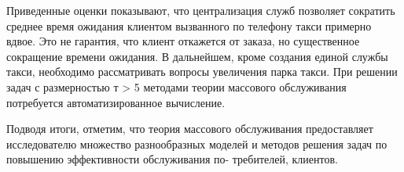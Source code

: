 Приведенные оценки показывают, что централизация служб позволяет сократить среднее время ожидания клиентом вызванного по телефону такси примерно вдвое. Это не гарантия, что клиент откажется от заказа, но существенное сокращение времени ожидания. В дальнейшем, кроме создания единой службы такси, необходимо рассматривать вопросы увеличения парка такси. При решении задач с размерностью т > 5 методами теории массового обслуживания потребуется автоматизированное вычисление.

Подводя итоги, отметим, что теория массового обслуживания предоставляет исследователю множество разнообразных моделей и методов решения задач по повышению эффективности обслуживания по-
требителей, клиентов.